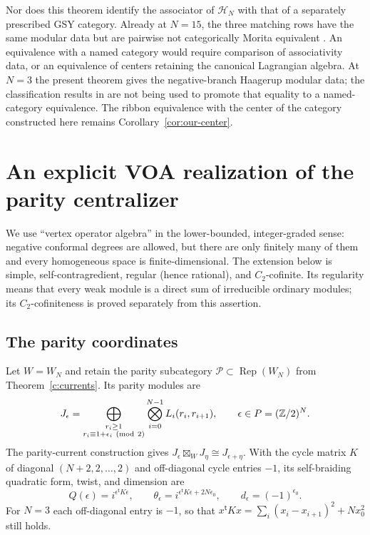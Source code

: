 \documentclass[11pt,a4paper]{article}
\numberwithin{equation}{section}
\theoremstyle{definition}\newtheorem{definition}[theorem]{Definition}
\theoremstyle{remark}\newtheorem{remark}[theorem]{Remark}
\begin{document}
Nor does this theorem identify the associator of $\mathcal H_N$
with that of a separately prescribed GSY category. Already at
$N=15$, the three matching rows have the same modular data but
are pairwise not categorically Morita equivalent
\cite[Corollary 5.9]{gsy}. An equivalence with a named category
would require comparison of associativity data, or an equivalence
of centers retaining the canonical Lagrangian algebra. At $N=3$
the present theorem gives the negative-branch Haagerup modular data;
the classification results in
\cite{grossmansnyder,grossmanizumi} are not being used to promote
that equality to a named-category equivalence. The ribbon
equivalence with the center of the category constructed here
remains Corollary~\ref{cor:our-center}.


\section{An explicit VOA realization of the parity centralizer}
\label{sec:parity-cancellation}

We use ``vertex operator algebra'' in the lower-bounded, integer-graded
sense: negative conformal degrees are allowed, but there are only
finitely many of them and every homogeneous space is finite-dimensional.
The extension below is simple, self-contragredient, regular
(hence rational), and $C_2$-cofinite. Its regularity means that every
weak module is a direct sum of irreducible ordinary modules; its
$C_2$-cofiniteness is proved separately from this assertion.

\subsection{The parity coordinates}

Let $W=W_N$ and retain the parity subcategory
$\mathcal P\subset\operatorname{Rep}(W_N)$ from
Theorem~\ref{c:currents}.
Its parity modules are
\[
 J_\epsilon=
 \bigoplus_{\substack{r_i\geq1\cr r_i\equiv1+\epsilon_i\ ({\rm mod}\ 2)}}
       \bigotimes_{i=0}^{N-1}L_i(r_i,r_{i+1}),
 \qquad \epsilon\in P=(\mathbb Z/2)^N.
\]
The parity-current construction gives
$J_\epsilon\boxtimes_WJ_\eta\cong J_{\epsilon+\eta}$.
With the cycle matrix $K$ of diagonal $(N+2,2,\ldots,2)$ and
off-diagonal cycle entries $-1$, its self-braiding quadratic form,
twist, and dimension are
\begin{equation}\label{eq:parity-data}
 Q(\epsilon)=i^{\epsilon^{\mathsf t}K\epsilon},\qquad
 \theta_\epsilon=i^{\epsilon^{\mathsf t}K\epsilon+2N\epsilon_0},
 \qquad d_\epsilon=(-1)^{\epsilon_0}.
\end{equation}
For $N=3$ each off-diagonal entry is $-1$, so that
$x^{\mathsf t}Kx=\sum_i(x_i-x_{i+1})^2+Nx_0^2$ still holds.
\end{document}
